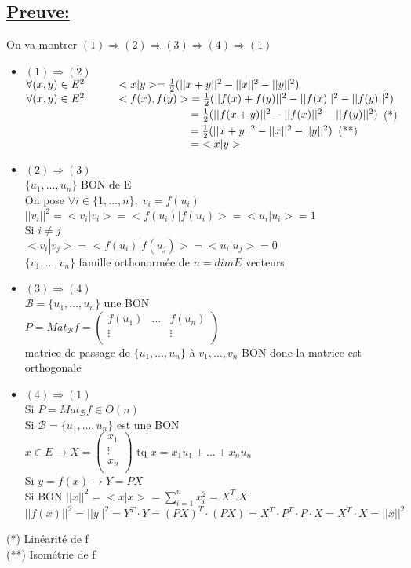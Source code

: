 \documentclass{article}
\newcommand\tab[1][1cm]{\hspace*{#1}}
\begin{document}
\subsection{\underline{Preuve:}}
On va montrer $(1) \Rightarrow (2) \Rightarrow (3) \Rightarrow (4) \Rightarrow (1)$
\begin{itemize}
    \item $(1) \Rightarrow (2)$\\
    $\forall (x, y) \in E^2 \tab <x|y> = \frac{1}{2}(||x+y||^2 - ||x||^2 - ||y||^2)$\\
    $\forall (x, y) \in E^2 \tab <f(x), f(y)> \; = \frac{1}{2}(||f(x) + f(y)||^2 - ||f(x)||^2 - ||f(y)||^2)$\\
    $\tab[5.3cm] =\frac{1}{2}(||f(x+y)||^2 - ||f(x)||^2 - ||f(y)||^2)$ (*)\\
    $\tab[5.3cm] =\frac{1}{2}(||x+y||^2 - ||x||^2 - ||y||^2)$ (**)\\
    $\tab[5.3cm] = \; <x|y>$
    \item $(2) \Rightarrow (3)$\\
    $\{u_1, \dots, u_n\}$ BON de E\\
    On pose $\forall i \in \{1, \dots, n\}, \; v_i = f(u_i)$\\
    $||v_i||^2 = <v_i|v_i> = <f(u_i)|f(u_i)> = <u_i|u_i> = 1$\\
    Si $i \neq j$\\
    $<v_i | v_j> = <f(u_i)|f(u_j)> = <u_i|u_j> = 0$\\
    $\{v_1, \dots, v_n\}$ famille orthonormée de $n = dim E$ vecteurs
    \item $(3) \Rightarrow (4)$\\
    $\mathcal{B} = \{u_1, \dots, u_n\}$ une BON\\
    $P = Mat_{\mathcal{B}}f = \begin{pmatrix}
        f(u_1) & \dots & f(u_n)\\
        \vdots & & \vdots\\
    \end{pmatrix}$\\
    matrice de passage de $\{u_1, \dots, u_n\}$ à $v_1, \dots, v_n$ BON donc la matrice est orthogonale
    \item $(4) \Rightarrow (1)$\\
    Si $P = Mat_{\mathcal{B}}f \in O(n)$\\
    Si $\mathcal{B} = \{u_1, \dots, u_n\}$ est une BON\\
    $x \in E \rightarrow X = \begin{pmatrix}
        x_1\\
        \vdots\\
        x_n\\
    \end{pmatrix}$ tq $x = x_1 u_1 + \dots + x_n u_n$\\
    Si $y = f(x) \rightarrow Y = PX$\\
    Si BON $||x||^2 = <x|x> = \sum_{i = 1}^n x_i^2 = X^T . X$\\
    $||f(x)||^2 = ||y||^2 = Y^T \cdot Y = (PX)^T \cdot (PX) = X^T \cdot P^T \cdot P \cdot X = X^T \cdot X = ||x||^2$
\end{itemize}
(*) Linéarité de f\\
(**) Isométrie de f
\end{document}
